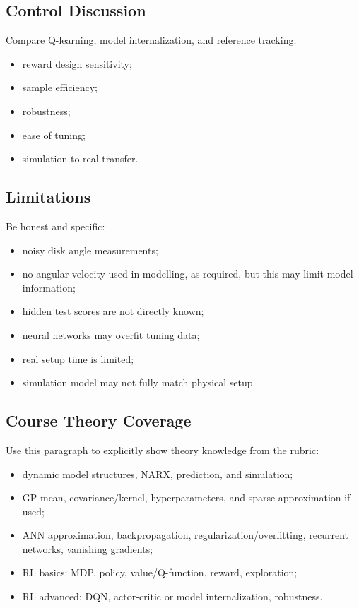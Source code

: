 \documentclass[conference]{IEEEtran}
\begin{document}
\subsection{Control Discussion}
Compare Q-learning, model internalization, and reference tracking:
\begin{itemize}
    \item reward design sensitivity;
    \item sample efficiency;
    \item robustness;
    \item ease of tuning;
    \item simulation-to-real transfer.
\end{itemize}

\subsection{Limitations}
Be honest and specific:
\begin{itemize}
    \item noisy disk angle measurements;
    \item no angular velocity used in modelling, as required, but this may limit model information;
    \item hidden test scores are not directly known;
    \item neural networks may overfit tuning data;
    \item real setup time is limited;
    \item simulation model may not fully match physical setup.
\end{itemize}

\subsection{Course Theory Coverage}
Use this paragraph to explicitly show theory knowledge from the rubric:
\begin{itemize}
    \item dynamic model structures, NARX, prediction, and simulation;
    \item GP mean, covariance/kernel, hyperparameters, and sparse approximation if used;
    \item ANN approximation, backpropagation, regularization/overfitting, recurrent networks, vanishing gradients;
    \item RL basics: MDP, policy, value/Q-function, reward, exploration;
    \item RL advanced: DQN, actor-critic or model internalization, robustness.
\end{itemize}
\end{document}
